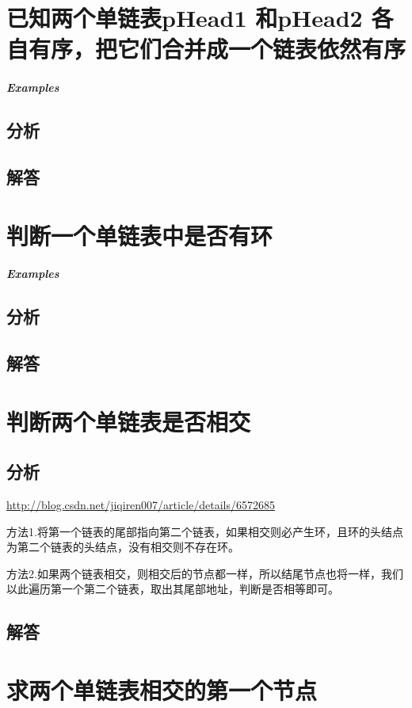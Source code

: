 \documentclass[UTF8,a4paper,12pt]{ctexbook}
\begin{document}
	
\section{已知两个单链表pHead1 和pHead2 各自有序，把它们合并成一个链表依然有序}
	
	\subparagraph{Examples}
	
	\subsection{分析}
	
	\subsection{解答}
	
	
\section{判断一个单链表中是否有环}
	
	\subparagraph{Examples}
	
	\subsection{分析}
	
	\subsection{解答}
	
	
\section{判断两个单链表是否相交}
	
	\subsection{分析}
		\url{http://blog.csdn.net/jiqiren007/article/details/6572685}
		
		方法1.将第一个链表的尾部指向第二个链表，如果相交则必产生环，且环的头结点为第二个链表的头结点，没有相交则不存在环。 
		
		方法2.如果两个链表相交，则相交后的节点都一样，所以结尾节点也将一样，我们以此遍历第一个第二个链表，取出其尾部地址，判断是否相等即可。
	\subsection{解答}
	
	
\section{求两个单链表相交的第一个节点}
	
\end{document}
